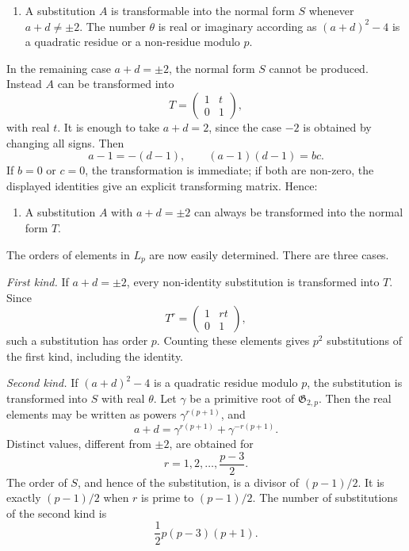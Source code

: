 \documentclass[11pt,a4paper]{article}
\begin{document}
\begin{enumerate}[label=\arabic*.]
\item A substitution \(A\) is transformable into the normal form \(S\) whenever \(a+d\ne\pm2\).  The number \(\theta\) is real or imaginary according as \((a+d)^2-4\) is a quadratic residue or a non-residue modulo \(p\).
\end{enumerate}

In the remaining case \(a+d=\pm2\), the normal form \(S\) cannot be produced.  Instead \(A\) can be transformed into
\begin{equation}\label{eq:68-6}
 T=\begin{pmatrix}1&t\\0&1\end{pmatrix},
\end{equation}
with real \(t\).  It is enough to take \(a+d=2\), since the case \(-2\) is obtained by changing all signs.  Then
\begin{equation}\label{eq:68-8}
 a-1=-(d-1),
 \qquad (a-1)(d-1)=bc.
\end{equation}
If \(b=0\) or \(c=0\), the transformation is immediate; if both are non-zero, the displayed identities give an explicit transforming matrix.  Hence:

\begin{enumerate}[label=\arabic*.,resume]
\item A substitution \(A\) with \(a+d=\pm2\) can always be transformed into the normal form \(T\).
\end{enumerate}

The orders of elements in \(L_p\) are now easily determined.  There are three cases.

\emph{First kind.}  If \(a+d=\pm2\), every non-identity substitution is transformed into \(T\).  Since
\[
 T^r=\begin{pmatrix}1&rt\\0&1\end{pmatrix},
\]
such a substitution has order \(p\).  Counting these elements gives \(p^2\) substitutions of the first kind, including the identity.

\emph{Second kind.}  If \((a+d)^2-4\) is a quadratic residue modulo \(p\), the substitution is transformed into \(S\) with real \(\theta\).  Let \(\gamma\) be a primitive root of \(\mathfrak G_{2,p}\).  Then the real elements may be written as powers \(\gamma^{r(p+1)}\), and
\begin{equation}\label{eq:68-9}
 a+d=\gamma^{r(p+1)}+\gamma^{-r(p+1)}.
\end{equation}
Distinct values, different from \(\pm2\), are obtained for
\begin{equation}\label{eq:68-10}
 r=1,2,\ldots,\frac{p-3}{2}.
\end{equation}
The order of \(S\), and hence of the substitution, is a divisor of \((p-1)/2\).  It is exactly \((p-1)/2\) when \(r\) is prime to \((p-1)/2\).  The number of substitutions of the second kind is
\begin{equation}\label{eq:68-count2}
 \frac12p(p-3)(p+1).
\end{equation}
\end{document}
